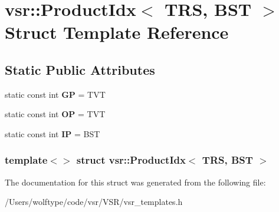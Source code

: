 \hypertarget{structvsr_1_1_product_idx_3_01_t_r_s_00_01_b_s_t_01_4}{\section{vsr\-:\-:Product\-Idx$<$ T\-R\-S, B\-S\-T $>$ Struct Template Reference}
\label{structvsr_1_1_product_idx_3_01_t_r_s_00_01_b_s_t_01_4}
}
\subsection*{Static Public Attributes}
\begin{DoxyCompactItemize}
\item 
\hypertarget{structvsr_1_1_product_idx_3_01_t_r_s_00_01_b_s_t_01_4_a2d9dcd91ce3776f12ecdb392a8fc7293}{static const int {\bfseries G\-P} = T\-V\-T}\label{structvsr_1_1_product_idx_3_01_t_r_s_00_01_b_s_t_01_4_a2d9dcd91ce3776f12ecdb392a8fc7293}

\item 
\hypertarget{structvsr_1_1_product_idx_3_01_t_r_s_00_01_b_s_t_01_4_a9c649231566c60a815ef4a5baa59386f}{static const int {\bfseries O\-P} = T\-V\-T}\label{structvsr_1_1_product_idx_3_01_t_r_s_00_01_b_s_t_01_4_a9c649231566c60a815ef4a5baa59386f}

\item 
\hypertarget{structvsr_1_1_product_idx_3_01_t_r_s_00_01_b_s_t_01_4_a253ee3ec0595921747d639a47e60bdde}{static const int {\bfseries I\-P} = B\-S\-T}\label{structvsr_1_1_product_idx_3_01_t_r_s_00_01_b_s_t_01_4_a253ee3ec0595921747d639a47e60bdde}

\end{DoxyCompactItemize}
\subsubsection*{template$<$$>$ struct vsr\-::\-Product\-Idx$<$ T\-R\-S, B\-S\-T $>$}



The documentation for this struct was generated from the following file\-:\begin{DoxyCompactItemize}
\item 
/\-Users/wolftype/code/vsr/\-V\-S\-R/vsr\-\_\-templates.\-h\end{DoxyCompactItemize}

